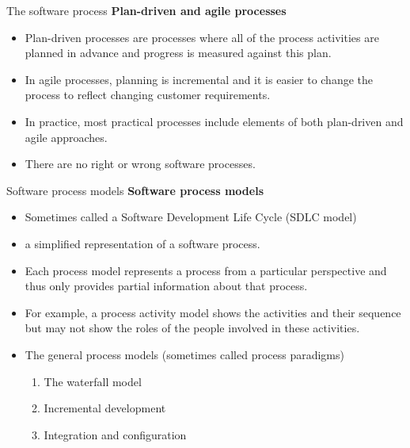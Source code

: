 \documentclass{beamer}
\begin{document}
\begin{frame}{The software process}
	\textbf{Plan-driven and agile processes}
\begin{itemize}
	\item Plan-driven processes are processes where all of the 
	process activities are planned in advance and progress 
	is measured against this plan. 
	\item In agile processes, planning is incremental and it is 
	easier to change the process to reflect changing 
	customer requirements. 
	\item In practice, most practical processes include elements of 
	both plan-driven and agile approaches. 
	\item There are no right or wrong software processes.
\end{itemize}
\end{frame}
\begin{frame}{Software process models}
	\textbf{Software process models}
	\begin{itemize}
		\item Sometimes called a Software Development Life Cycle (SDLC model)
		\item a simplified representation of a software process. 
		\item Each process model represents a process from a particular perspective and thus only provides partial information about that process. 
		\item For example, a process activity model shows the activities and their sequence but may not show the roles of the people involved in these activities.
		\item The general process models (sometimes called process paradigms)
			\begin{enumerate}
			\item The waterfall model
			\item Incremental development	
			\item Integration and configuration
		\end{enumerate}
	\end{itemize}
\end{frame}
\end{document}
